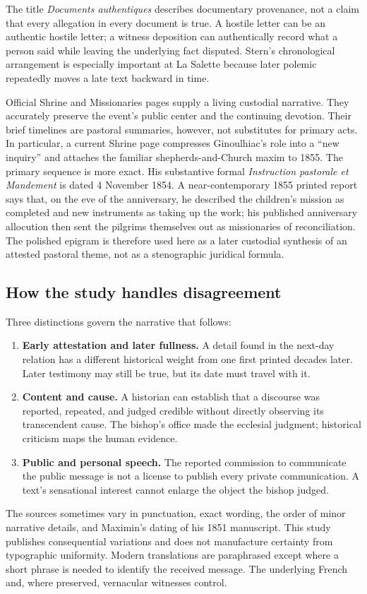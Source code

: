 The title \emph{Documents authentiques} describes documentary provenance, not a claim that every allegation in every document is true. A hostile letter can be an authentic hostile letter; a witness deposition can authentically record what a person said while leaving the underlying fact disputed. Stern's chronological arrangement is especially important at La Salette because later polemic repeatedly moves a late text backward in time.

Official Shrine and Missionaries pages supply a living custodial narrative. They accurately preserve the event's public center and the continuing devotion. Their brief timelines are pastoral summaries, however, not substitutes for primary acts. In particular, a current Shrine page compresses Ginoulhiac's role into a ``new inquiry'' and attaches the familiar shepherds-and-Church maxim to 1855. The primary sequence is more exact. His substantive formal \emph{Instruction pastorale et Mandement} is dated 4 November 1854. A near-contemporary 1855 printed report says that, on the eve of the anniversary, he described the children's mission as completed and new instruments as taking up the work; his published anniversary allocution then sent the pilgrims themselves out as missionaries of reconciliation. The polished epigram is therefore used here as a later custodial synthesis of an attested pastoral theme, not as a stenographic juridical formula.

\subsection{How the study handles disagreement}

Three distinctions govern the narrative that follows:

\begin{enumerate}
  \item \textbf{Early attestation and later fullness.} A detail found in the next-day relation has a different historical weight from one first printed decades later. Later testimony may still be true, but its date must travel with it.
  \item \textbf{Content and cause.} A historian can establish that a discourse was reported, repeated, and judged credible without directly observing its transcendent cause. The bishop's office made the ecclesial judgment; historical criticism maps the human evidence.
  \item \textbf{Public and personal speech.} The reported commission to communicate the public message is not a license to publish every private communication. A text's sensational interest cannot enlarge the object the bishop judged.
\end{enumerate}

The sources sometimes vary in punctuation, exact wording, the order of minor narrative details, and Maximin's dating of his 1851 manuscript. This study publishes consequential variations and does not manufacture certainty from typographic uniformity. Modern translations are paraphrased except where a short phrase is needed to identify the received message. The underlying French and, where preserved, vernacular witnesses control.
